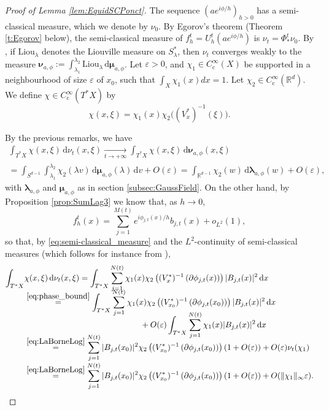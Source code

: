 \documentclass[10pt]{amsart}
\newcommand{\rc}{\mathrm{c}}
\newcommand{\rd}{\,\mathrm{d}}
\theoremstyle{plain}
\theoremstyle{definition}
\newcommand{\R}{\mathbb{R}}
\let\eps\varepsilon
\begin{document}
\begin{proof}[Proof of Lemma \ref{lem:EquidSCPonct}]
The sequence $(a e^{i\phi/h})_{h>0}$ has a semi-classical measure, which we denote by $\nu_0$. By Egorov's theorem (Theorem \ref{t:Egorov} below), the semi-classical measure of $f_h^t=U_h^t (a e^{i\phi/h})$ is $\nu_t = \Phi^t_* \nu_0$. By \cite[Th.\,1]{Schu}, if $\mathrm{Liou}_\lambda$ denotes the Liouville measure on $S_\lambda^*$, then $\nu_t$ converges weakly to the measure $ \boldsymbol{\nu}_{a,\phi}:=\int_{\lambda_1}^{\lambda_2}\mathrm{Liou}_\lambda \rd \boldsymbol{\mu}_{a,\phi}$. Let $\varepsilon>0$, and $\chi_1 \in C_\rc^\infty(X)$ be supported in a neighbourhood of size $\varepsilon$ of $x_0$, such that $\int_X\chi_1(x)dx=1$. Let $\chi_2\in C_\rc^\infty(\R^d)$. We define $\chi\in C_\rc^\infty(T^*X)$ by\vspace*{-3pt}
\[
\chi(x,\xi) = \chi_1(x) \chi_2 \bigl((V^*_x)^{-1}(\xi) \bigr).
\]

By the previous remarks, we have\vspace*{-5pt}
\begin{multline*}
\int_{T^*X} \chi(x,\xi) \rd \nu_t(x,\xi) \underset{t\to +\infty}{\to} \int_{T^*X} \chi(x,\xi)\rd \boldsymbol{\nu}_{a,\phi}(x,\xi)\\[-3pt]
= \int_{S^{d-1}} \int_{\lambda_1}^{\lambda_2} \chi_2(\lambda v) \rd \boldsymbol{\mu}_{a,\phi}(\lambda) \rd v + O(\varepsilon)= \int_{\mathbb{R}^{d-1}} \chi_2(w) \rd \boldsymbol{\lambda}_{a,\phi}(w) + O(\varepsilon),
\end{multline*}
with $\boldsymbol{\lambda}_{a,\phi}$ and $\boldsymbol{\mu}_{a,\phi}$ as in section \ref{subsec:GaussField}. On the other hand, by Proposition \ref{prop:SumLag3} we know that, as $h\to 0$,\vspace*{-5pt}
\[f_h^t (x) = \sum_{j=1}^{M(t)} e^{i\phi_{j, t}(x)/h} b_{j, t}(x) + o_{L^2}(1),
\]
so that, by \eqref{eq:semi-classical_measure} and the $L^2$-continuity of semi-classical measures (which follows for instance from \cite[Th.\,5.1]{Zworski_2012}),\vspace*{-3pt}
\begin{align*}
\int_{T^*X} &\chi(x,\xi)\rd \nu_t(x,\xi) = \int_{T^*X} \sum_{j=1}^{N(t)} \chi_1(x)\chi_2\left((V_x^*)^{-1}\left(\partial \phi_{j,t}(x)\right)\right) |B_{j,t}(x)|^2 \rd x\\[-8pt]
&\overset{\eqref{eq:phase_bound}}{=}\int_{T^*X} \sum_{j=1}^{N(t)} \chi_1(x)\chi_2\left((V_{x_0}^*)^{-1}\left(\partial \phi_{j,t}(x_0)\right)\right) |B_{j,t}(x)|^2 \rd x\\[-10pt]
&\hspace*{5cm}+O(\eps)\int_{T^*X} \sum_{j=1}^{N(t)} \chi_1(x)|B_{j,t}(x)|^2 \rd x\\[-10pt]
&\overset{\eqref{eq:LaBorneLog}}{=}\sum_{j=1}^{N(t)} |B_{j,t}(x_0)|^2 \chi_2\left((V_{x_0}^*)^{-1}\left(\partial \phi_{j,t}(x_0)\right)\right) (1+O(\eps))+O(\eps)\nu_t(\chi_1)\\[-3pt]
&\overset{\eqref{eq:LaBorneLog}}{=}\sum_{j=1}^{N(t)} |B_{j,t}(x_0)|^2 \chi_2\left((V_{x_0}^*)^{-1}\left(\partial \phi_{j,t}(x_0)\right)\right) (1+O(\eps))+O(\|\chi_1\|_\infty\eps).
\end{align*}


\end{proof}
\end{document}
